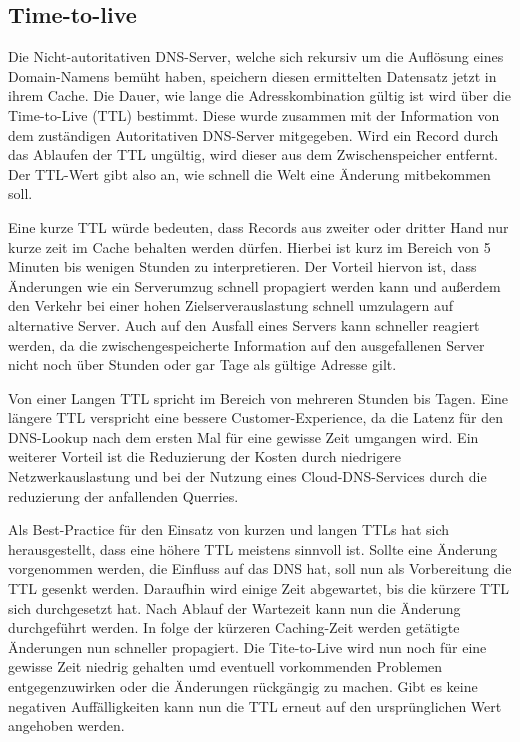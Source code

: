 \subsection{Time-to-live} \label{lab:ttl}
Die Nicht-autoritativen DNS-Server, welche sich rekursiv um die Auflösung eines Domain-Namens bemüht haben, speichern diesen ermittelten Datensatz jetzt in ihrem Cache. Die Dauer, wie lange die Adresskombination gültig ist wird über die Time-to-Live (TTL) bestimmt. Diese wurde zusammen mit der Information von dem zuständigen Autoritativen DNS-Server mitgegeben. Wird ein Record durch das Ablaufen der TTL ungültig, wird dieser aus dem Zwischenspeicher entfernt. Der TTL-Wert gibt also an, wie schnell die Welt eine Änderung mitbekommen soll. 

Eine kurze TTL würde bedeuten, dass Records aus zweiter oder dritter Hand nur kurze zeit im Cache behalten werden dürfen. Hierbei ist kurz im Bereich von 5 Minuten bis wenigen Stunden zu interpretieren. Der Vorteil hiervon ist, dass Änderungen wie ein Serverumzug schnell propagiert werden kann und außerdem den Verkehr bei einer hohen Zielserverauslastung schnell umzulagern auf alternative Server. Auch auf den Ausfall eines Servers kann schneller reagiert werden, da die zwischengespeicherte Information auf den ausgefallenen Server nicht noch über Stunden oder gar Tage als gültige Adresse gilt.

Von einer Langen TTL spricht im Bereich von mehreren Stunden bis Tagen. Eine längere TTL verspricht eine bessere Customer-Experience, da die Latenz für den DNS-Lookup nach dem ersten Mal für eine gewisse Zeit umgangen wird. Ein weiterer Vorteil ist die Reduzierung der Kosten durch niedrigere Netzwerkauslastung und bei der Nutzung eines Cloud-DNS-Services durch die reduzierung der anfallenden Querries.

Als Best-Practice für den Einsatz von kurzen und langen TTLs hat sich herausgestellt, dass eine höhere TTL meistens sinnvoll ist. Sollte eine Änderung vorgenommen werden, die Einfluss auf das DNS hat, soll nun als Vorbereitung die TTL gesenkt werden. Daraufhin wird einige Zeit abgewartet, bis die kürzere TTL sich durchgesetzt hat. Nach Ablauf der Wartezeit kann nun die Änderung durchgeführt werden. In folge der kürzeren Caching-Zeit werden getätigte Änderungen nun schneller propagiert. Die Tite-to-Live wird nun noch für eine gewisse Zeit niedrig gehalten umd eventuell vorkommenden Problemen entgegenzuwirken oder die Änderungen rückgängig zu machen. Gibt es keine negativen Auffälligkeiten kann nun die TTL erneut auf den ursprünglichen Wert angehoben werden.


